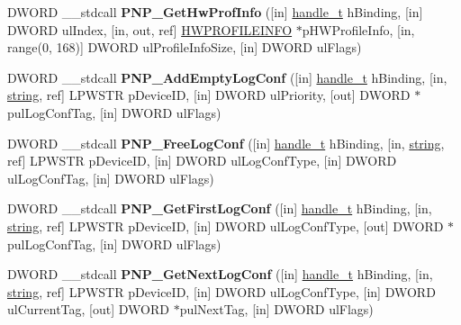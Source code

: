 \begin{DoxyCompactItemize}
\item 
\mbox{\label{interfacepnp_af9df44b5baca88de597c9ce29d7bea57}} 
D\+W\+O\+RD \+\_\+\+\_\+stdcall {\bfseries P\+N\+P\+\_\+\+Get\+Hw\+Prof\+Info} (\mbox{[}in\mbox{]} \hyperlink{interfacevoid}{handle\+\_\+t} h\+Binding, \mbox{[}in\mbox{]} D\+W\+O\+RD ul\+Index, \mbox{[}in, out, ref\mbox{]} \hyperlink{struct_h_w_profile_info__s_a}{H\+W\+P\+R\+O\+F\+I\+L\+E\+I\+N\+FO} $\ast$p\+H\+W\+Profile\+Info, \mbox{[}in, range(0, 168)\mbox{]} D\+W\+O\+RD ul\+Profile\+Info\+Size, \mbox{[}in\mbox{]} D\+W\+O\+RD ul\+Flags)
\item 
\mbox{\label{interfacepnp_ab6991509af70cc5b0a98c62b13e3821b}} 
D\+W\+O\+RD \+\_\+\+\_\+stdcall {\bfseries P\+N\+P\+\_\+\+Add\+Empty\+Log\+Conf} (\mbox{[}in\mbox{]} \hyperlink{interfacevoid}{handle\+\_\+t} h\+Binding, \mbox{[}in, \hyperlink{structstring}{string}, ref\mbox{]} L\+P\+W\+S\+TR p\+Device\+ID, \mbox{[}in\mbox{]} D\+W\+O\+RD ul\+Priority, \mbox{[}out\mbox{]} D\+W\+O\+RD $\ast$pul\+Log\+Conf\+Tag, \mbox{[}in\mbox{]} D\+W\+O\+RD ul\+Flags)
\item 
\mbox{\label{interfacepnp_a32babd712c5e88725ec5d9ff22fd7570}} 
D\+W\+O\+RD \+\_\+\+\_\+stdcall {\bfseries P\+N\+P\+\_\+\+Free\+Log\+Conf} (\mbox{[}in\mbox{]} \hyperlink{interfacevoid}{handle\+\_\+t} h\+Binding, \mbox{[}in, \hyperlink{structstring}{string}, ref\mbox{]} L\+P\+W\+S\+TR p\+Device\+ID, \mbox{[}in\mbox{]} D\+W\+O\+RD ul\+Log\+Conf\+Type, \mbox{[}in\mbox{]} D\+W\+O\+RD ul\+Log\+Conf\+Tag, \mbox{[}in\mbox{]} D\+W\+O\+RD ul\+Flags)
\item 
\mbox{\label{interfacepnp_afebae7e73760d9453503512a90a042d6}} 
D\+W\+O\+RD \+\_\+\+\_\+stdcall {\bfseries P\+N\+P\+\_\+\+Get\+First\+Log\+Conf} (\mbox{[}in\mbox{]} \hyperlink{interfacevoid}{handle\+\_\+t} h\+Binding, \mbox{[}in, \hyperlink{structstring}{string}, ref\mbox{]} L\+P\+W\+S\+TR p\+Device\+ID, \mbox{[}in\mbox{]} D\+W\+O\+RD ul\+Log\+Conf\+Type, \mbox{[}out\mbox{]} D\+W\+O\+RD $\ast$pul\+Log\+Conf\+Tag, \mbox{[}in\mbox{]} D\+W\+O\+RD ul\+Flags)
\item 
\mbox{\label{interfacepnp_a468d58a276afbcb90eb8c90c5a10efcb}} 
D\+W\+O\+RD \+\_\+\+\_\+stdcall {\bfseries P\+N\+P\+\_\+\+Get\+Next\+Log\+Conf} (\mbox{[}in\mbox{]} \hyperlink{interfacevoid}{handle\+\_\+t} h\+Binding, \mbox{[}in, \hyperlink{structstring}{string}, ref\mbox{]} L\+P\+W\+S\+TR p\+Device\+ID, \mbox{[}in\mbox{]} D\+W\+O\+RD ul\+Log\+Conf\+Type, \mbox{[}in\mbox{]} D\+W\+O\+RD ul\+Current\+Tag, \mbox{[}out\mbox{]} D\+W\+O\+RD $\ast$pul\+Next\+Tag, \mbox{[}in\mbox{]} D\+W\+O\+RD ul\+Flags)

\end{DoxyCompactItemize}
